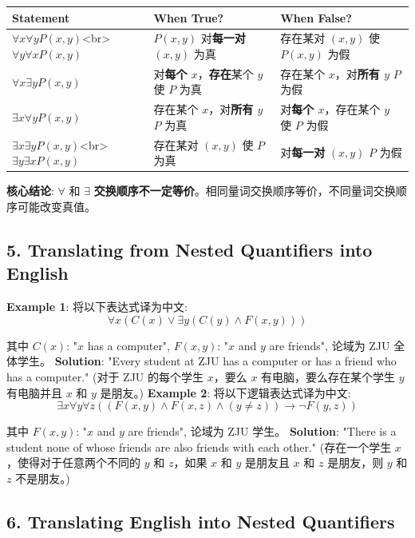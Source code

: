 \documentclass[10pt,a4paper,openany]{ctexbook}
\theoremstyle{definition}
\theoremstyle{remark}
\begin{document}
\begin{center}
\begin{tabular}{lll}
\hline
Statement & When True? & When False? \\ \hline
$\forall x \forall y P(x,y)$<br>$\forall y \forall x P(x,y)$ & $P(x,y)$ 对\textbf{每一对} $(x,y)$ 为真 & 存在某对 $(x,y)$ 使 $P(x,y)$ 为假 \\
$\forall x \exists y P(x,y)$ & 对\textbf{每个 $x$}，\textbf{存在}某个 $y$ 使 $P$ 为真 & 存在某个 $x$，对\textbf{所有 $y$} $P$ 为假 \\
$\exists x \forall y P(x,y)$ & 存在某个 $x$，对\textbf{所有 $y$} $P$ 为真 & 对\textbf{每个 $x$}，存在某个 $y$ 使 $P$ 为假 \\
$\exists x \exists y P(x,y)$<br>$\exists y \exists x P(x,y)$ & 存在某对 $(x,y)$ 使 $P$ 为真 & 对\textbf{每一对} $(x,y)$ $P$ 为假 \\
\hline
\end{tabular}

\end{center}

\textbf{核心结论}: $\forall$ 和 $\exists$ \textbf{交换顺序不一定等价}。相同量词交换顺序等价，不同量词交换顺序可能改变真值。
\vspace{-2pt}

\subsection{5. Translating from Nested Quantifiers into English}

\textbf{Example 1}: 将以下表达式译为中文:
\[
\forall x (C(x) \lor \exists y (C(y) \land F(x,y)))
\]

其中 $C(x)$: "$x$ has a computer", $F(x,y)$: "$x$ and $y$ are friends", 论域为 ZJU 全体学生。
\textbf{Solution}: "Every student at ZJU has a computer or has a friend who has a computer."
(对于 ZJU 的每个学生 $x$，要么 $x$ 有电脑，要么存在某个学生 $y$ 有电脑并且 $x$ 和 $y$ 是朋友。)
\textbf{Example 2}: 将以下逻辑表达式译为中文:
\[
\exists x \forall y \forall z ((F(x,y) \land F(x,z) \land (y \neq z)) \to \neg F(y,z))
\]

其中 $F(x,y)$: "$x$ and $y$ are friends", 论域为 ZJU 学生。
\textbf{Solution}: "There is a student none of whose friends are also friends with each other."
(存在一个学生 $x$，使得对于任意两个不同的 $y$ 和 $z$，如果 $x$ 和 $y$ 是朋友且 $x$ 和 $z$ 是朋友，则 $y$ 和 $z$ 不是朋友。)
\vspace{-2pt}

\subsection{6. Translating English into Nested Quantifiers}
\end{document}
